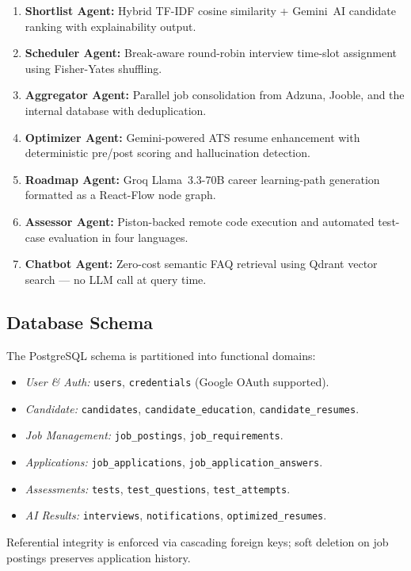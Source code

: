 \documentclass[conference]{IEEEtran}
\begin{document}
\begin{enumerate}
\item \textbf{Shortlist Agent:} Hybrid TF-IDF cosine similarity + Gemini~AI candidate ranking with explainability output.
\item \textbf{Scheduler Agent:} Break-aware round-robin interview time-slot assignment using Fisher-Yates shuffling.
\item \textbf{Aggregator Agent:} Parallel job consolidation from Adzuna, Jooble, and the internal database with deduplication.
\item \textbf{Optimizer Agent:} Gemini-powered ATS resume enhancement with deterministic pre/post scoring and hallucination detection.
\item \textbf{Roadmap Agent:} Groq Llama~3.3-70B career learning-path generation formatted as a React-Flow node graph.
\item \textbf{Assessor Agent:} Piston-backed remote code execution and automated test-case evaluation in four languages.
\item \textbf{Chatbot Agent:} Zero-cost semantic FAQ retrieval using Qdrant vector search — no LLM call at query time.
\end{enumerate}

\subsection{Database Schema}

The PostgreSQL schema is partitioned into functional domains:
\begin{itemize}
\item \textit{User \& Auth:} \texttt{users}, \texttt{credentials} (Google OAuth supported).
\item \textit{Candidate:} \texttt{candidates}, \texttt{candidate\_education}, \texttt{candidate\_resumes}.
\item \textit{Job Management:} \texttt{job\_postings}, \texttt{job\_requirements}.
\item \textit{Applications:} \texttt{job\_applications}, \texttt{job\_application\_answers}.
\item \textit{Assessments:} \texttt{tests}, \texttt{test\_questions}, \texttt{test\_attempts}.
\item \textit{AI Results:} \texttt{interviews}, \texttt{notifications}, \texttt{optimized\_resumes}.
\end{itemize}
Referential integrity is enforced via cascading foreign keys; soft deletion on job postings preserves application history.
\end{document}
